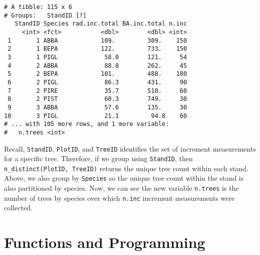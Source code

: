 \documentclass[]{krantz}
\makeatletter
\newenvironment{Shaded}{\begin{snugshade}}{\end{snugshade}}
\newcommand{\KeywordTok}[1]{\textcolor[rgb]{0.27,0.27,0.27}{\textbf{#1}}}
\newcommand{\DataTypeTok}[1]{\textcolor[rgb]{0.27,0.27,0.27}{#1}}
\newcommand{\StringTok}[1]{\textcolor[rgb]{0.5,0.5,0.5}{#1}}
\newcommand{\OperatorTok}[1]{\textcolor[rgb]{0.43,0.43,0.43}{\textbf{#1}}}
\newcommand{\NormalTok}[1]{#1}
\newenvironment{kframe}{%
\medskip{}
\setlength{\fboxsep}{.8em}
 \def\at@end@of@kframe{}%
 \ifinner\ifhmode%
  \def\at@end@of@kframe{\end{minipage}}%
  \begin{minipage}{\columnwidth}%
 \fi\fi%
 \def\FrameCommand##1{\hskip\@totalleftmargin \hskip-\fboxsep
 \colorbox{shadecolor}{##1}\hskip-\fboxsep
     \hskip-\linewidth \hskip-\@totalleftmargin \hskip\columnwidth}%
 \MakeFramed {\advance\hsize-\width
   \@totalleftmargin\z@ \linewidth\hsize
   \@setminipage}}%
 {\par\unskip\endMakeFramed%
 \at@end@of@kframe}
\renewenvironment{Shaded}{\begin{kframe}}{\end{kframe}}
\theoremstyle{definition}
\theoremstyle{definition}
\theoremstyle{definition}
\theoremstyle{remark}
\makeatother
\begin{document}
\begin{Shaded}
\end{Shaded}

\begin{verbatim}
# A tibble: 115 x 6
# Groups:   StandID [?]
   StandID Species rad.inc.total BA.inc.total n.inc
     <int> <fct>           <dbl>        <dbl> <int>
 1       1 ABBA            109.         309.    150
 2       1 BEPA            122.         733.    150
 3       1 PIGL             58.0        121.     54
 4       2 ABBA             88.8        262.     45
 5       2 BEPA            101.         488.    180
 6       2 PIGL             86.3        431.     90
 7       2 PIRE             35.7        510.     60
 8       2 PIST             60.3        749.     30
 9       3 ABBA             57.6        135.     30
10       3 PIGL             21.1         94.8    60
# ... with 105 more rows, and 1 more variable:
#   n.trees <int>
\end{verbatim}

Recall, \texttt{StandID}, \texttt{PlotID}, and \texttt{TreeID}
identifies the set of increment measurements for a specific tree.
Therefore, if we group using \texttt{StandID}, then
\texttt{n\_distinct(PlotID,\ TreeID)} returns the unique tree count
within each stand. Above, we also group by \texttt{Species} so the
unique tree count within the stand is also partitioned by species. Now,
we can see the new variable \texttt{n.trees} is the number of trees by
species over which \texttt{n.inc} increment measurements were collected.

\chapter{Functions and Programming}\label{functions-and-programming}
\end{document}

